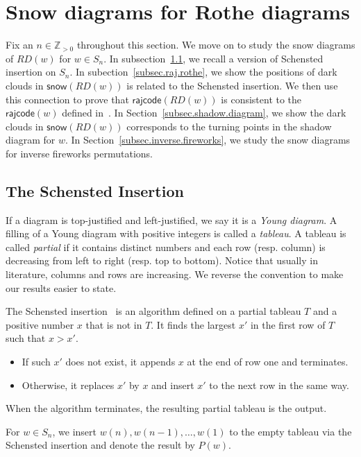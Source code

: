 \documentclass[ALCO]{cedram}
\newcommand{\snow}{\mathsf{snow}}
\newcommand{\rajcode}{\mathsf{rajcode}}
\newcommand{\definition}[1]{{\color{darkred}\emph{#1}}}
\begin{document}
\section{Snow diagrams for Rothe diagrams}
\label{S: permutations}
Fix an $n \in \mathbb{Z}_{>0}$
throughout this section. 
We move on to study the snow diagrams 
of $RD(w)$ for $w \in S_n$. 
In subsection~\ref{SS: insertion},
we recall a version of Schensted insertion on $S_n$.
In subection~\ref{subsec.raj.rothe}, we 
show the positions of dark clouds in $\snow(RD(w))$ 
is related to the Schensted insertion.
We then use this connection to 
prove that $\rajcode(RD(w))$ is consistent 
to the $\rajcode(w)$ defined in~\cite{PSW}.
In Section~\ref{subsec.shadow.diagram}, we show the dark clouds
in $\snow(RD(w))$ corresponds to
the turning points in the shadow diagram for $w$.
In Section~\ref{subsec.inverse.fireworks}, we study the
snow diagrams for inverse fireworks permutations.

\subsection{The Schensted Insertion}
\label{SS: insertion}

If a diagram is top-justified and left-justified,
we say it is a \definition{Young diagram}.
A filling of a Young diagram with positive integers
is called a \definition{tableau}.
A tableau is called \definition{partial}
if it contains distinct numbers and 
each row (resp. column) is decreasing from left to right 
(resp. top to bottom).
Notice that usually in literature, columns and rows 
are increasing. 
We reverse the convention to make our results easier to state.

The Schensted insertion~\cite{Sch}
is an algorithm defined on a partial tableau $T$ and 
a positive number $x$ that is not in $T$.
It finds the largest $x'$
in the first row of $T$ 
such that $x > x'$.
\begin{itemize}
    \item If such $x'$ does not exist,
it appends $x$ at the end of row one
and terminates.
    \item Otherwise, it replaces $x'$ by $x$
and insert $x'$ to the next row
in the same way. 
\end{itemize}
When the algorithm terminates, 
the resulting partial tableau is the output. 

For $w \in S_n$, we insert $w(n), w(n-1), \dots, w(1)$ to the empty tableau via the Schensted insertion and denote the result by $P(w)$. 
\end{document}
